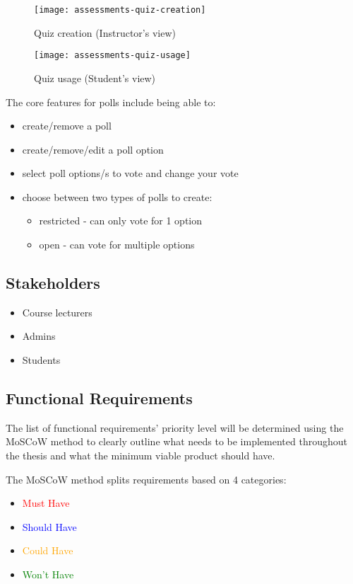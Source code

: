 \begin{figure}[!hbpt]
	\centering
	\begin{minipage}{0.45\textwidth}
		\centering
		\texttt{[image: assessments-quiz-creation]}
		\caption{Quiz creation (Instructor's view)}
	\end{minipage}\hfill
	\begin{minipage}{0.45\textwidth}
		\centering
		\texttt{[image: assessments-quiz-usage]}
		\caption{Quiz usage (Student's view)}
	\end{minipage}\hfill
\end{figure}

The core features for polls include being able to:
\begin{itemize}
	\item create/remove a poll
	\item create/remove/edit a poll option
	\item select poll options/s to vote and change your vote
	\item choose between two types of polls to create:
		\begin{itemize}
			\item restricted - can only vote for 1 option
			\item open - can vote for multiple options
		\end{itemize}
\end{itemize}


\subsection{Stakeholders}
\begin{itemize}
	\item Course lecturers
	\item Admins
	\item Students
\end{itemize}

\subsection{Functional Requirements}
The list of functional requirements' priority level will be determined using the MoSCoW method to clearly outline what needs to be implemented throughout the thesis and what the minimum viable product should have. 

The MoSCoW method splits requirements based on 4 categories:
\begin{itemize}
	\item \textcolor{Red}{Must Have}
	\item \textcolor{Blue}{Should Have}
	\item \textcolor{Orange}{Could Have}
	\item \textcolor{Green}{Won't Have}
\end{itemize}

